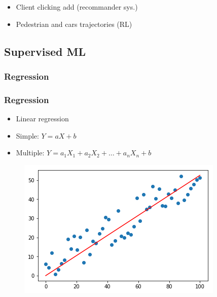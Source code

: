\begin{frame}
\begin{itemize}
\begin{itemize}
\begin{minipage}{0.60\linewidth}
\begin{figure}[H]
            \end{figure}
         \end{minipage}
         \item Client clicking add (recommander sys.)
         \item Pedestrian and cars trajectories (RL)
      \end{itemize}
   \end{itemize}
\end{frame}


\subsection{Supervised ML}

\subsubsection{Regression}


\begin{frame}\frametitle{Regression}
   \begin{itemize}
      \item Linear regression
      \item Simple: $Y = aX + b$
      \item Multiple: $Y = a_1X_1 + a_2X_2 + \dots + a_nX_n + b$
   \end{itemize}

   \begin{figure}[H]
      \includegraphics[scale=.35]{../images/illustrations/model_linear_regression.png}
   \end{figure}
\end{frame}


